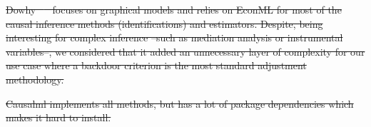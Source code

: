 \documentclass[10pt,letterpaper]{article}
\providecommand{\DIFdeltex}[1]{{\protect\color{red}\sout{#1}}}                      %
\providecommand{\DIFdel}[1]{\texorpdfstring{\DIFdeltex{#1}}{}} %
\begin{document}
\DIFdel{Dowhy \mbox{%
    \cite{sharma2020dowhy} }\hskip0pt%
  focuses on graphical models and relies on EconML for most of the causal
  inference methods (identifications) and estimators. Despite, being interesting
  for complex inference --such as mediation analysis or instrumental variables--,
  we considered that it added an unnecessary layer of complexity for our use case
  where a backdoor criterion is the most standard adjustment methodology.
}%

\DIFdel{Causalml implements all methods, but has a lot of package dependencies
  which makes it hard to install.
}%

\end{document}
